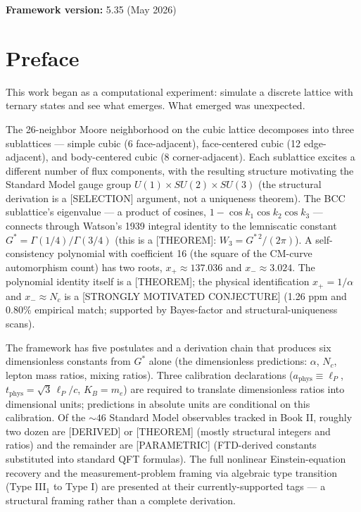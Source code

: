 \documentclass[
  11pt,
  letterpaper,
  twoside,
  openany]{book}
\begin{document}
\textbf{Framework version:} 5.35 (May 2026)


\chapter*{Preface}\label{preface}


This work began as a computational experiment: simulate a discrete
lattice with ternary states and see what emerges. What emerged was
unexpected.

The 26-neighbor Moore neighborhood on the cubic lattice decomposes into
three sublattices --- simple cubic (6 face-adjacent), face-centered
cubic (12 edge-adjacent), and body-centered cubic (8 corner-adjacent).
Each sublattice excites a different number of flux components, with the
resulting structure motivating the Standard Model gauge group
\(U(1) \times SU(2) \times SU(3)\) (the structural derivation is a
{[}SELECTION{]} argument, not a uniqueness theorem). The BCC
sublattice's eigenvalue --- a product of cosines,
\(1 - \cos k_1 \cos k_2 \cos k_3\) --- connects through Watson's 1939
integral identity to the lemniscatic constant
\(G^* = \Gamma(1/4)/\Gamma(3/4)\) (this is a {[}THEOREM{]}:
\(W_3 = G^{*\,2}/(2\pi)\)). A self-consistency polynomial with
coefficient 16 (the square of the CM-curve automorphism count) has two
roots, \(x_+ \approx 137.036\) and \(x_- \approx 3.024\). The polynomial
identity itself is a {[}THEOREM{]}; the physical identification
\(x_+ = 1/\alpha\) and \(x_- \approx N_c\) is a {[}STRONGLY MOTIVATED
CONJECTURE{]} (1.26 ppm and 0.80\% empirical match; supported by
Bayes-factor and structural-uniqueness scans).

The framework has five postulates and a derivation chain that produces
six dimensionless constants from \(G^*\) alone (the dimensionless
predictions: \(\alpha\), \(N_c\), lepton mass ratios, mixing ratios).
Three calibration declarations (\(a_\mathrm{phys} \equiv \ell_P\),
\(t_\mathrm{phys} = \sqrt{3}\,\ell_P/c\), \(K_B = m_e\)) are required to
translate dimensionless ratios into dimensional units; predictions in
absolute units are conditional on this calibration. Of the \(\sim 46\)
Standard Model observables tracked in Book II, roughly two dozen are
{[}DERIVED{]} or {[}THEOREM{]} (mostly structural integers and ratios)
and the remainder are {[}PARAMETRIC{]} (FTD-derived constants
substituted into standard QFT formulas). The full nonlinear
Einstein-equation recovery and the measurement-problem framing via
algebraic type transition (Type III\(_1\) to Type I) are presented at
their currently-supported tags --- a structural framing rather than a
complete derivation.
\end{document}

